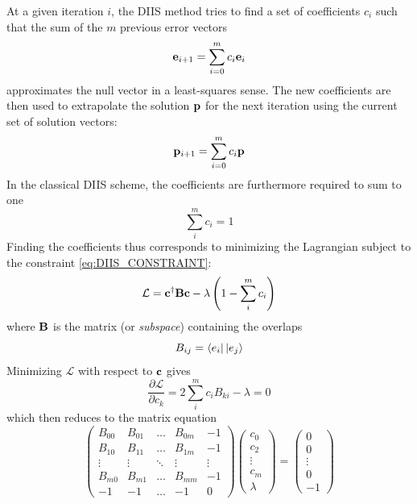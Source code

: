 At a given iteration $i$, the DIIS method tries to find a set of coefficients $c_i$ such that the sum of the $m$ previous error vectors 
\begin{equation}
\mathbf{e}_{i+1} = \sum_{i=0}^m c_i \mathbf{e}_i
\end{equation}
\noindent approximates the null vector in a least-squares sense. The new coefficients are then used to extrapolate the solution $\mathbf{p}$ for the next iteration using the current set of solution vectors:
\begin{equation}
\mathbf{p}_{i+1} = \sum_{i=0}^m c_i \mathbf{p}
\end{equation} 
\noindent In the classical DIIS scheme, the coefficients are furthermore required to sum to one 
\begin{equation}
\sum_i^m c_i = 1
\label{eq:DIIS_CONSTRAINT}
\end{equation}
\noindent Finding the coefficients thus corresponds to minimizing the Lagrangian subject to the constraint \ref{eq:DIIS_CONSTRAINT}:
\begin{equation}
\mathcal{L} = \mathbf{c}^{\dagger} \mathbf{B} \mathbf{c} - \lambda \left( 1 - \sum_i^m c_i \right)
\end{equation}
\noindent where $\mathbf{B}$ is the matrix (or \emph{subspace})
containing the overlaps
\begin{equation}
B_{ij} = \sbra{e_i}\sket{e_j}
\end{equation}
\noindent Minimizing $\mathcal{L}$ with respect to $\mathbf{c}$ gives
\begin{equation}
\frac{\partial \mathcal{L}}{\partial c_k} = 2 \sum_i^m c_i B_{ki} - \lambda = 0
\end{equation}
\noindent which then reduces to the matrix equation
\begin{equation}
\begin{pmatrix}
B_{00} & B_{01} & \ldots & B_{0m} & -1 \\
B_{10} & B_{11} & \ldots & B_{1m} & -1 \\
\vdots & \vdots & \ddots & \vdots & \vdots \\
B_{m0} & B_{m1} & \ldots & B_{mm} & -1 \\
-1 & -1 & \ldots & -1 & 0
\end{pmatrix}
\begin{pmatrix}
c_0 \\
c_2 \\
\vdots \\
c_m \\
\lambda 
\end{pmatrix}
=
\begin{pmatrix}
0 \\ 0 \\ \vdots \\ 0 \\ -1
\end{pmatrix}
\end{equation}

